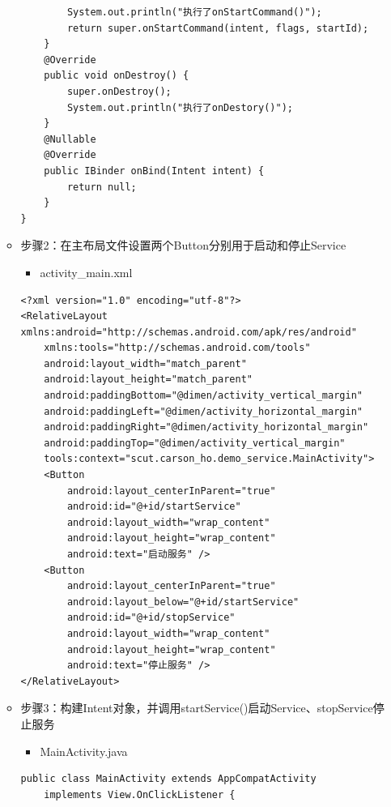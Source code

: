 \documentclass[9pt, b5paper]{article}
\begin{document}
\begin{enumerate}
\begin{itemize}
\begin{verbatim}
        System.out.println("执行了onStartCommand()");
        return super.onStartCommand(intent, flags, startId);
    }
    @Override
    public void onDestroy() {
        super.onDestroy();
        System.out.println("执行了onDestory()");
    }
    @Nullable
    @Override
    public IBinder onBind(Intent intent) {
        return null;
    }
}
\end{verbatim}
\item 步骤2：在主布局文件设置两个Button分别用于启动和停止Service
\begin{itemize}
\item activity\_main.xml
\end{itemize}
\begin{verbatim}
<?xml version="1.0" encoding="utf-8"?>
<RelativeLayout xmlns:android="http://schemas.android.com/apk/res/android"
    xmlns:tools="http://schemas.android.com/tools"
    android:layout_width="match_parent"
    android:layout_height="match_parent"
    android:paddingBottom="@dimen/activity_vertical_margin"
    android:paddingLeft="@dimen/activity_horizontal_margin"
    android:paddingRight="@dimen/activity_horizontal_margin"
    android:paddingTop="@dimen/activity_vertical_margin"
    tools:context="scut.carson_ho.demo_service.MainActivity">
    <Button
        android:layout_centerInParent="true"
        android:id="@+id/startService"
        android:layout_width="wrap_content"
        android:layout_height="wrap_content"
        android:text="启动服务" />
    <Button
        android:layout_centerInParent="true"
        android:layout_below="@+id/startService"
        android:id="@+id/stopService"
        android:layout_width="wrap_content"
        android:layout_height="wrap_content"
        android:text="停止服务" />
</RelativeLayout>
\end{verbatim}
\item 步骤3：构建Intent对象，并调用startService()启动Service、stopService停止服务
\begin{itemize}
\item MainActivity.java
\end{itemize}
\begin{verbatim}
public class MainActivity extends AppCompatActivity
    implements View.OnClickListener {


\end{verbatim}
\end{itemize}
\end{enumerate}
\end{document}
